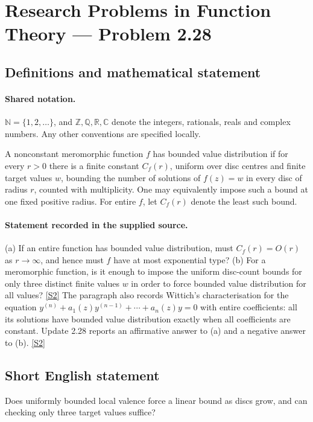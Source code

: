 \documentclass[11pt]{article}
\newcommand{\sref}[2]{\hyperlink{source:#1:#2}{[S#2]}}
\begin{document}
\section{Research Problems in Function Theory — Problem 2.28}\label{statement}

\subsection{Definitions and mathematical statement}

\paragraph{Shared notation.}$\mathbb N=\{1,2,\ldots\}$, and $\mathbb Z,\mathbb Q,\mathbb R,\mathbb C$ denote the integers, rationals, reals and complex numbers. Any other conventions are specified locally.


A nonconstant meromorphic function $f$ has bounded value distribution if for every $r>0$ there is a finite constant $C_f(r)$, uniform over disc centres and finite target values $w$, bounding the number of solutions of $f(z)=w$ in every disc of radius $r$, counted with multiplicity. One may equivalently impose such a bound at one fixed positive radius.
For entire $f$, let $C_f(r)$ denote the least such bound.

\paragraph{Statement recorded in the supplied source.}
(a) If an entire function has bounded value distribution, must $C_f(r)=O(r)$ as $r\to\infty$, and hence must $f$ have at most exponential type?
(b) For a meromorphic function, is it enough to impose the uniform disc-count bounds for only three distinct finite values $w$ in order to force bounded value distribution for all values? \sref{statement}{2}
The paragraph also records Wittich's characterisation for the equation $y^{(n)}+a_1(z)y^{(n-1)}+\cdots+a_n(z)y=0$ with entire coefficients: all its solutions have bounded value distribution exactly when all coefficients are constant. Update 2.28 reports an affirmative answer to (a) and a negative answer to (b). \sref{statement}{2}
\subsection{Short English statement}
Does uniformly bounded local valence force a linear bound as discs grow, and can checking only three target values suffice?
\end{document}

